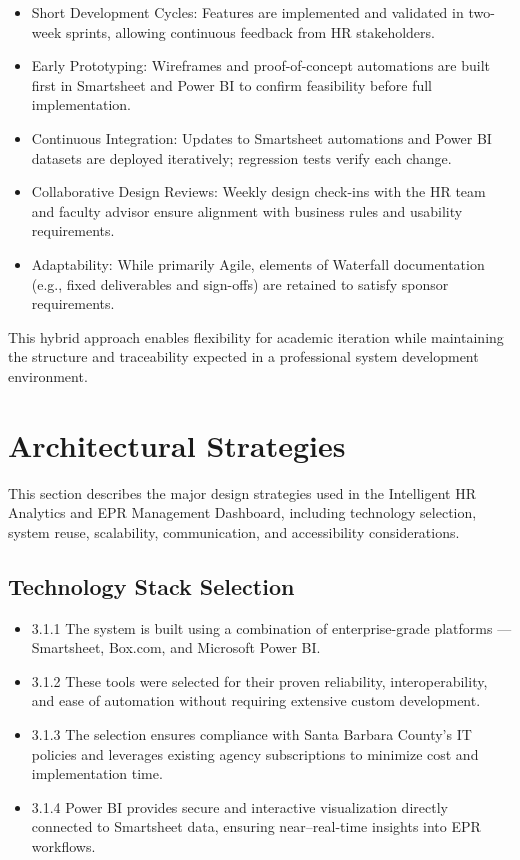 \documentclass[12pt]{article}
\def\textbf#1{#1}%
\def\&{ and }%
\begin{document}
\begin{itemize}[nosep]
    \item \textbf{Short Development Cycles:} Features are implemented and validated in two-week sprints, allowing continuous feedback from HR stakeholders.
    \item \textbf{Early Prototyping:} Wireframes and proof-of-concept automations are built first in Smartsheet and Power BI to confirm feasibility before full implementation.
    \item \textbf{Continuous Integration:} Updates to Smartsheet automations and Power BI datasets are deployed iteratively; regression tests verify each change.
    \item \textbf{Collaborative Design Reviews:} Weekly design check-ins with the HR team and faculty advisor ensure alignment with business rules and usability requirements.
    \item \textbf{Adaptability:} While primarily Agile, elements of Waterfall documentation (e.g., fixed deliverables and sign-offs) are retained to satisfy sponsor requirements.
\end{itemize}

This hybrid approach enables flexibility for academic iteration while maintaining the structure and traceability expected in a professional system development environment.

\section{Architectural Strategies}
This section describes the major design strategies used in the Intelligent HR Analytics \& EPR Management Dashboard, including technology selection, system reuse, scalability, communication, and accessibility considerations.

\subsection{Technology Stack Selection}
\begin{itemize}
  \item \textbf{3.1.1} The system is built using a combination of enterprise-grade platforms — Smartsheet, Box.com, and Microsoft Power BI.
  \item \textbf{3.1.2} These tools were selected for their proven reliability, interoperability, and ease of automation without requiring extensive custom development.
  \item \textbf{3.1.3} The selection ensures compliance with Santa Barbara County’s IT policies and leverages existing agency subscriptions to minimize cost and implementation time.
  \item \textbf{3.1.4} Power BI provides secure and interactive visualization directly connected to Smartsheet data, ensuring near–real-time insights into EPR workflows.
\end{itemize}
\end{document}

